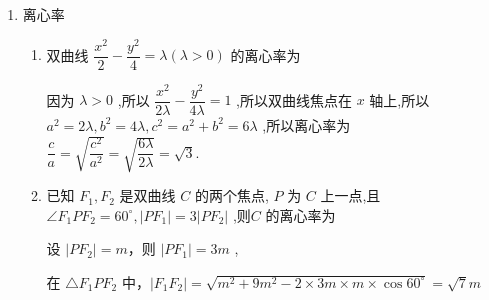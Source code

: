 \begin{enumerate}
\begin{enumerate}
\begin{enumerate}
\begin{jieda}
\begin{dingautolist}{172}
                    即 $9{m}^{2} = {m}^{2} + {16}{a}^{2} - 2 \times  m \times  {4a} \times  \dfrac{m}{2a}$ ,解得 $\dfrac{m}{a} = \dfrac{2\sqrt{3}}{3}$ .
                    
                    故 $\cos \angle {COA} = \cos \angle {OCA} = \dfrac{m}{2a} = \dfrac{\sqrt{3}}{3},\tan \angle {COA} = \sqrt{2}$ ,
                    
                    所以 $\Gamma$ 的渐近线方程是 $y =  \pm  \sqrt{2}x$ .
                \end{dingautolist}

            \ps 求双曲线的渐近线方程, 常见方法:
            \end{jieda}
        \end{enumerate}
        \item 离心率
        \begin{enumerate}
            \item 双曲线 $\dfrac{{x}^{2}}{2} - \dfrac{{y}^{2}}{4} = \lambda \left( {\lambda  > 0}\right)$ 的离心率为
            \begin{jieda}
                因为 $\lambda  > 0$ ,所以 $\dfrac{{x}^{2}}{2\lambda } - \dfrac{{y}^{2}}{4\lambda } = 1$ ,所以双曲线焦点在 $x$ 轴上,所以 ${a}^{2} = {2\lambda },{b}^{2} = {4\lambda },{c}^{2} = {a}^{2} + {b}^{2} = {6\lambda }$ ,所以离心率为 $\dfrac{c}{a} = \sqrt{\dfrac{{c}^{2}}{{a}^{2}}} = \sqrt{\dfrac{6\lambda }{2\lambda }} = \sqrt{3}.$
            \end{jieda}
            \item 已知 ${F}_{1},{F}_{2}$ 是双曲线 $C$ 的两个焦点, $P$ 为 $C$ 上一点,且 $\angle {F}_{1}P{F}_{2} = {60}^{ \circ  },\left| {P{F}_{1}}\right|  = 3\left| {P{F}_{2}}\right|$ ,则$C$ 的离心率为
    
            \begin{jieda}
                设 $\left| {P{F}_{2}}\right|  = m$，则 $\left| {P{F}_{1}}\right|  = {3m}$ ,
                
                在 $\bigtriangleup {F}_{1}P{F}_{2}$ 中，$\left| {{F}_{1}{F}_{2}}\right|  = \sqrt{{m}^{2} + 9{m}^{2} - 2 \times  {3m} \times  m \times  \cos {60}^{ \circ  }} = \sqrt{7}m$
                

\end{jieda}
\end{enumerate}
\end{enumerate}
\end{enumerate}
